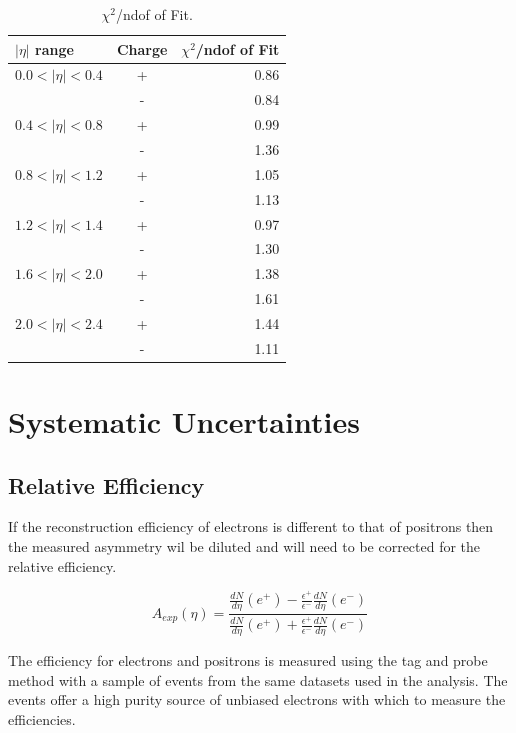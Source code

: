 \begin{table}[htb]
\begin{center}
\begin{tabular}{|lc|r|}
$|\eta|$ range &Charge & $\chi^2$/ndof of Fit\\
\hline
$0.0<| \eta |<0.4$ &+&  0.86\\
                   &-&  0.84\\
$0.4<| \eta |<0.8$ &+&  0.99\\
                   &-&  1.36\\
$0.8<| \eta |<1.2$ &+&  1.05\\
                   &-&  1.13\\
$1.2<| \eta |<1.4$ &+&  0.97\\
                   &-&  1.30\\
$1.6<| \eta |<2.0$ &+&  1.38\\
                   &-&  1.61\\
$2.0<| \eta |<2.4$ &+&  1.44\\
                   &-&  1.11\\
\end{tabular}
\caption{\label{tab:chi2}$\chi^2$/ndof of Fit.}
\end{center}
\end{table}

\section{Systematic Uncertainties}
\subsection{Relative Efficiency}

If the reconstruction efficiency of electrons is different to that of positrons
then the measured asymmetry wil be diluted and will need to be corrected for
the relative efficiency.

\begin{equation}
A_{exp}(\eta) = \frac{
                    \frac{dN}{d\eta}(e^+)-
                    \frac{\epsilon^+}{\epsilon^-}\frac{dN}{d\eta}(e^-)
                }
                {
                    \frac{dN}{d\eta}(e^+)+
                    \frac{\epsilon^+}{\epsilon^-}\frac{dN}{d\eta}(e^-)
                }
\end{equation}

The efficiency for electrons and positrons is measured using the tag and probe
method %
with a sample of \Zee events from the same datasets used in the analysis. 
The \Zee events offer a high purity source of unbiased electrons with which to
measure the efficiencies.

